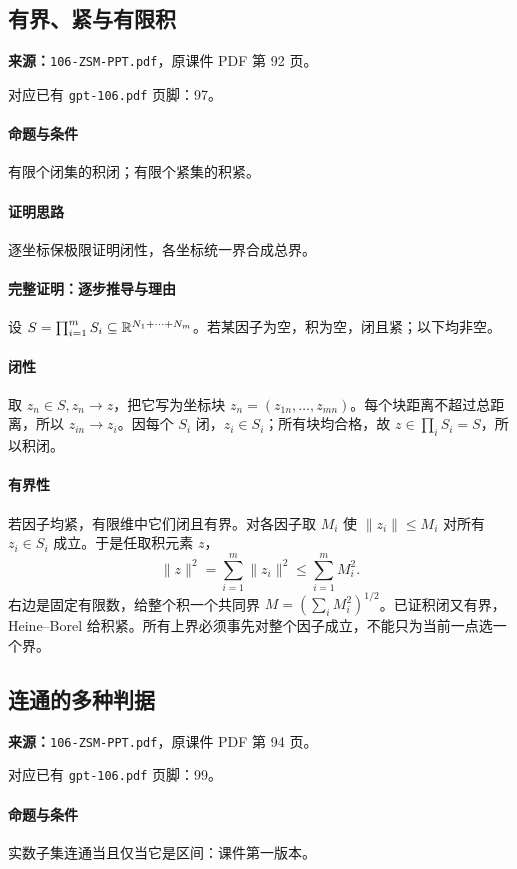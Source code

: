 \clearpage\subsection{有界、紧与有限积}
\textbf{来源：}\texttt{106-ZSM-PPT.pdf}，原课件 PDF 第 92 页。\par
对应已有 \texttt{gpt-106.pdf} 页脚：97。\par
\paragraph{命题与条件}有限个闭集的积闭；有限个紧集的积紧。
\paragraph{证明思路}逐坐标保极限证明闭性，各坐标统一界合成总界。
\paragraph{完整证明：逐步推导与理由}

设 $S=\prod_{i=1}^mS_i\subseteq\mathbb{R}^{N_1+\cdots+N_m}$。若某因子为空，积为空，闭且紧；以下均非空。
\paragraph{闭性}取 $z_n\in S,z_n\to z$，把它写为坐标块 $z_n=(z_{1n},\ldots,z_{mn})$。每个块距离不超过总距离，所以 $z_{in}\to z_i$。因每个 $S_i$ 闭，$z_i\in S_i$；所有块均合格，故 $z\in\prod_iS_i=S$，所以积闭。
\paragraph{有界性}若因子均紧，有限维中它们闭且有界。对各因子取 $M_i$ 使 $\|z_i\|\le M_i$ 对所有 $z_i\in S_i$ 成立。于是任取积元素 $z$，
\[\|z\|^2=\sum_{i=1}^m\|z_i\|^2\le\sum_{i=1}^mM_i^2.\]
右边是固定有限数，给整个积一个共同界 $M=(\sum_iM_i^2)^{1/2}$。已证积闭又有界，Heine--Borel 给积紧。所有上界必须事先对整个因子成立，不能只为当前一点选一个界。

\clearpage\subsection{连通的多种判据}
\textbf{来源：}\texttt{106-ZSM-PPT.pdf}，原课件 PDF 第 94 页。\par
对应已有 \texttt{gpt-106.pdf} 页脚：99。\par
\paragraph{命题与条件}实数子集连通当且仅当它是区间：课件第一版本。
